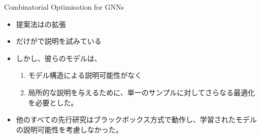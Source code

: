 \documentclass[a4paper,10pt]{ltjsarticle}
\newcommand{\1}{\mbox{1}\hspace{-0.25em}\mbox{l}}
\theoremstyle{definition}
\begin{document}
    Combinatorial Optimisation for GNNs
    \begin{itemize}
        \item 提案法は\cite{velivckovic2020pointer, velivckovic2019neural}の拡張
        \item \cite{velivckovic2020pointer}だけが\cite{ying2019gnnexplainer}で説明を試みている
        \item しかし、彼らのモデルは、
        \begin{enumerate}
            \item モデル構造による説明可能性がなく
            \item 局所的な説明を与えるために、単一のサンプルに対してさらなる最適化を必要とした。
        \end{enumerate}
        \item 他のすべての先行研究はブラックボックス方式で動作し、学習されたモデルの説明可能性を考慮しなかった。
    \end{itemize}
\end{document}
